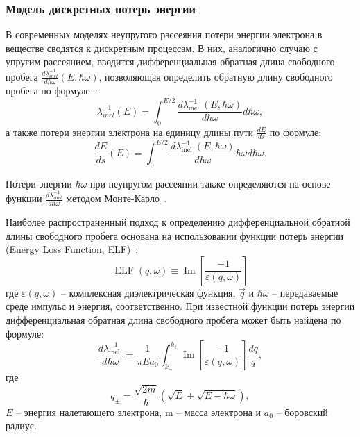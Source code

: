 \subsubsection{Модель дискретных потерь энергии}
В современных моделях неупругого рассеяния потери энергии электрона в веществе сводятся к дискретным процессам. В них, аналогично случаю с упругим рассеянием, вводится дифференциальная обратная длина свободного пробега $\frac{d \lambda_{inel}^{-1}}{d \hbar \omega}(E, \hbar \omega)$, позволяющая определить обратную длину свободного пробега по формуле~\cite{Dapor_large_book}:
\begin{equation}
	\lambda_{inel}^{-1}(E)=\int_0^{E / 2} \frac{d \lambda_{\text {inel }}^{-1}(E, \hbar \omega)}{d \hbar \omega} d \hbar \omega,
\end{equation}
а также потери энергии электрона на единицу длины пути $\frac{dE}{ds}$ по формуле:
\begin{equation}
	\frac{dE}{ds}(E) = \int_0^{E / 2} \frac{d \lambda_{\text {inel }}^{-1}(E, \hbar \omega)}{d \hbar \omega} \hbar \omega d \hbar \omega.
\end{equation}

Потери энергии $\hbar \omega$ при неупругом рассеянии также определяются на основе функции $\frac{d \lambda_{inel}^{-1}}{d \hbar \omega}$  методом Монте-Карло~\cite{Ciappa_2010}.

Наиболее распространенный подход к определению дифференциальной обратной длины свободного пробега основана на использовании функции потерь энергии (Energy Loss Function, ELF)~\cite{Dapor_large_book}:
\begin{equation}
	\operatorname{ELF}(q, \omega) \equiv \operatorname{Im}\left[\frac{-1}{\varepsilon(q, \omega)}\right]
\end{equation}
где $\varepsilon(q, \omega)$ -- комплексная диэлектрическая функция, $\vec{q}$ и $\hbar \omega$ -- передаваемые среде импульс и энергия, соответственно. При известной функции потерь энергии дифференциальная обратная длина свободного пробега может быть найдена по формуле:
\begin{equation}
	\frac{d \lambda_{\text {inel }}^{-1}}{d \hbar \omega}=\frac{1}{\pi E a_0} \int_{k_{-}}^{k_{+}} \operatorname{Im}\left[\frac{-1}{\varepsilon(q, \omega)}\right] \frac{d q}{q},
\end{equation}
где
\begin{equation}
	q_{\pm}=\frac{\sqrt{2 m}}{\hbar}(\sqrt{E} \pm \sqrt{E-\hbar \omega}),
\end{equation}
$E$ -- энергия налетающего электрона, m -- масса электрона и $a_0$ -- боровский радиус.

